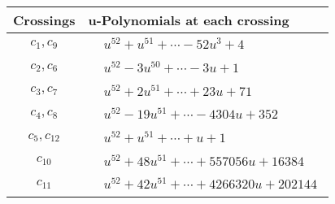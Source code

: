 \documentclass[1p]{elsarticle_modified}
\theoremstyle{definition}
\begin{document}
\begin{tabular}{m{50pt}|m{274pt}}
Crossings & \hspace{64pt}u-Polynomials at each crossing \\
\hline $$\begin{aligned}c_{1},c_{9}\end{aligned}$$&$\begin{aligned}
&u^{52}+u^{51}+\cdots-52 u^3+4
\end{aligned}$\\
\hline $$\begin{aligned}c_{2},c_{6}\end{aligned}$$&$\begin{aligned}
&u^{52}-3 u^{50}+\cdots-3 u+1
\end{aligned}$\\
\hline $$\begin{aligned}c_{3},c_{7}\end{aligned}$$&$\begin{aligned}
&u^{52}+2 u^{51}+\cdots+23 u+71
\end{aligned}$\\
\hline $$\begin{aligned}c_{4},c_{8}\end{aligned}$$&$\begin{aligned}
&u^{52}-19 u^{51}+\cdots-4304 u+352
\end{aligned}$\\
\hline $$\begin{aligned}c_{5},c_{12}\end{aligned}$$&$\begin{aligned}
&u^{52}+u^{51}+\cdots+u+1
\end{aligned}$\\
\hline $$\begin{aligned}c_{10}\end{aligned}$$&$\begin{aligned}
&u^{52}+48 u^{51}+\cdots+557056 u+16384
\end{aligned}$\\
\hline $$\begin{aligned}c_{11}\end{aligned}$$&$\begin{aligned}
&u^{52}+42 u^{51}+\cdots+4266320 u+202144
\end{aligned}$\\
\hline
\end{tabular}\\~\\
\newpage\renewcommand{\arraystretch}{1}
\end{document}

